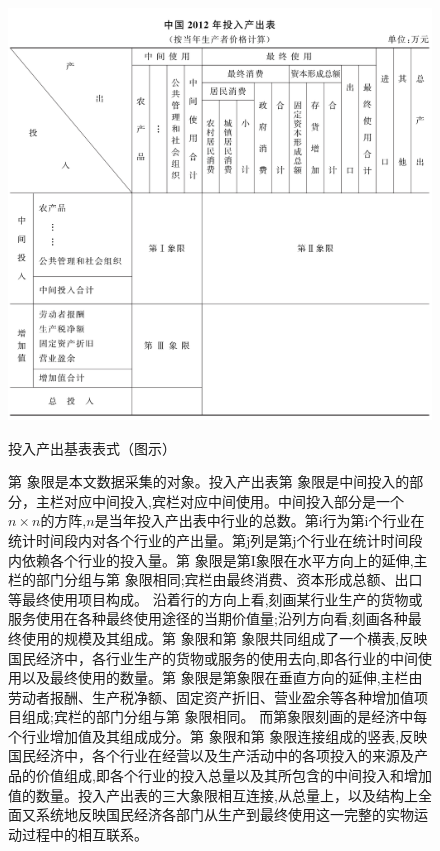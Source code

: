 \documentclass{sysuthesis}
\begin{document}
  \begin{figure}[h!tbp]
  \centering
  \includegraphics[scale=0.65]{image/投入产出表_1.png}
  \caption{投入产出基表表式（图示）}
  \caption*{\footnotesize 第\uppercase\expandafter{}
象限是本文数据采集的对象。投入产出表第\uppercase\expandafter{}
象限是中间投入的部分，主栏对应中间投入,宾栏对应中间使用。中间投入部分是一个$n \times n$的方阵,$n$是当年投入产出表中行业的总数。第i行为第i个行业在统计时间段内对各个行业的产出量。第j列是第j个行业在统计时间段内依赖各个行业的投入量。第\uppercase\expandafter{}
象限是第I象限在水平方向上的延伸,主栏的部门分组与第\uppercase\expandafter{}
象限相同;宾栏由最终消费、资本形成总额、出口等最终使用项目构成。 沿着行的方向上看,刻画某行业生产的货物或服务使用在各种最终使用途径的当期价值量;沿列方向看,刻画各种最终使用的规模及其组成。第\uppercase\expandafter{}
象限和第\uppercase\expandafter{}
象限共同组成了一个横表,反映国民经济中，各行业生产的货物或服务的使用去向,即各行业的中间使用以及最终使用的数量。第\uppercase\expandafter{}
象限是第\uppercase\expandafter{}象限在垂直方向的延伸,主栏由劳动者报酬、生产税净额、固定资产折旧、营业盈余等各种增加值项目组成;宾栏的部门分组与第\uppercase\expandafter{}
象限相同。 而第\uppercase\expandafter{}象限刻画的是经济中每个行业增加值及其组成成分。第\uppercase\expandafter{}
象限和第\uppercase\expandafter{}
象限连接组成的竖表,反映国民经济中，各个行业在经营以及生产活动中的各项投入的来源及产品的价值组成,即各个行业的投入总量以及其所包含的中间投入和增加值的数量。投入产出表的三大象限相互连接,从总量上，以及结构上全面又系统地反映国民经济各部门从生产到最终使用这一完整的实物运动过程中的相互联系。 }
  \label{fig:ioaccount}
  \end{figure}
\end{document}
